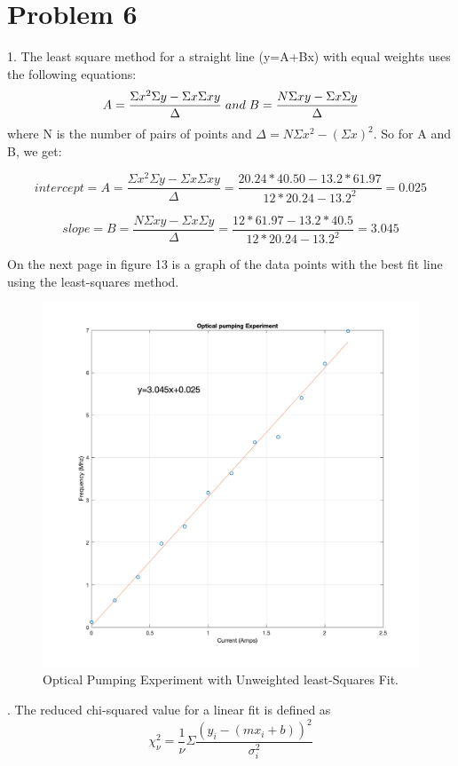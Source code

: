 \documentclass{article}
\begin{document}
\section*{Problem 6} 
1. The least square method for a straight line (y=A+Bx) with equal weights uses the following equations:
\[ A=\frac{\Sigma x^2\Sigma y-\Sigma x\Sigma xy}{\Delta}\hspace{1mm}and\hspace{1mm}B=\frac{N\Sigma xy-\Sigma x\Sigma y}{\Delta} \]
\noindent where N is the number of pairs of points and $\Delta=N\Sigma x^2-(\Sigma x)^2$. So for A and B, we get:

\[ intercept=A=\frac{\Sigma x^2\Sigma y-\Sigma x\Sigma xy}{\Delta}=\frac{20.24*40.50-13.2*61.97}{12*20.24-13.2^2 }=\boxed{0.025}\]

\[ slope=B=\frac{N\Sigma xy-\Sigma x\Sigma y}{\Delta}=\frac{12*61.97-13.2*40.5}{12*20.24-13.2^2}=\boxed{3.045}\]

On the next page in figure 13 is a graph of the data points with the best fit line using the least-squares method.

\begin{figure}[H]
  \centering
  \includegraphics[width=0.8\linewidth]{lateximages/Prob6_1.png}
  \caption{Optical Pumping Experiment with Unweighted least-Squares Fit.}
  \label{fig:boat2}
  \end{figure}  
  
 . The reduced chi-squared value for a linear fit is defined as \[\chi_{\nu}^2=\frac{1}{\nu}\Sigma \frac{(y_i-(mx_i+b))^2}{\sigma_{i}^2}\]
 
\end{document}
